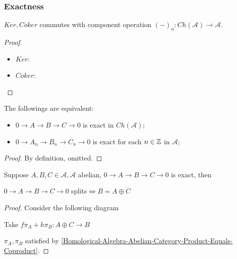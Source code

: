 \documentclass[Total.tex]{subfiles}
\begin{document}
				\subsubsection{Exactness}
				\begin{lemma}
					$Ker,Coker$ commutes with component operation $(-)_n:Ch(\mathcal{A})\rightarrow \mathcal{A}$.
				\end{lemma}
				\begin{proof}
					\begin{itemize}
						\item $Ker$:
						\item $Coker$:
					\end{itemize}
				\end{proof}
				\begin{proposition}
					The followings are equivalent:
					\begin{itemize}
						\item $0\rightarrow A\rightarrow B\rightarrow C\rightarrow0$ is exact in $Ch(\mathcal{A})$;
						\item $0\rightarrow A_n\rightarrow B_n\rightarrow C_n\rightarrow 0$ is exact for each $n\in \mathbb{Z}$ in $\mathcal{A}$;
					\end{itemize}
				\end{proposition}
				\begin{proof}
					By definition, omitted.	
				\end{proof}
				
				\begin{proposition}
					Suppose $A,B,C\in \mathcal{A},\mathcal{A}$ abelian, $0\rightarrow A\rightarrow B\rightarrow C\rightarrow 0$ is exact, then
					\begin{center}
						$0\rightarrow A\rightarrow B\rightarrow C\rightarrow 0$ splits$\Leftrightarrow B=A\oplus C$ 
					\end{center}
				\end{proposition}
				\begin{proof}
					Consider the following diagram
					\begin{center}
						Take $f\pi _A+h \pi_B:A\oplus C\rightarrow B$
					\end{center}
					$\pi_A,\pi_B$ satisfied by \ref{Homological-Algebra-Abelian-Category-Product-Equals-Coproduct}.
				\end{proof}
				
\end{document}

